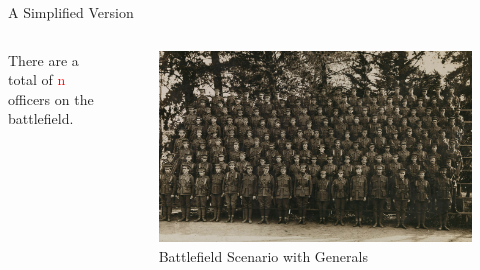 \documentclass{beamer}
\begin{document}
\begin{frame}{A Simplified Version}
\begin{columns} 
         There are a total of \textcolor{red}{n} officers on the battlefield.

        \begin{figure}
            \includegraphics[width=\textwidth]{images2/museums-victoria-kfmpzG39ndk-unsplash.jpg}
            \caption{Battlefield Scenario with Generals}
        \end{figure}
\end{columns}
\end{frame}
\end{document}
